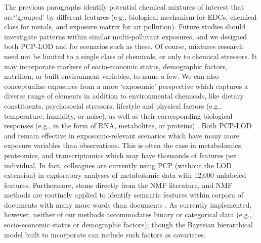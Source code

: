 The previous paragraphs identify potential chemical mixtures of interest that are`'grouped' by different features (e.g., biological mechanism for EDCs, chemical class for metals, and exposure matrix for air pollution). Future studies should investigate patterns within similar multi-pollutant exposures, and we designed both PCP-LOD and \bnmf for scenarios such as these. Of course, mixtures research need not be limited to a single class of chemicals, or only to chemical stressors. It may incorporate markers of socio-economic status, demographic factors, nutrition, or built environment variables, to name a few. We can also conceptualize exposures from a more `exposomic' perspective which captures a diverse range of elements in addition to environmental chemicals, like dietary constituents, psychosocial stressors, lifestyle and physical factors (e.g., temperature, humidity, or noise), as well as their corresponding biological responses (e.g., in the form of RNA, metabolites, or proteins) \citep{vermeulen2020exposome}. Both PCP-LOD and \bnmf remain effective in exposomic-relevant scenarios which have many more exposure variables than observations. This is often the case in metabolomics, proteomics, and transcriptomics which may have thousands of features per individual. In fact, colleagues are currently using PCP (without the LOD extension) in exploratory analyses of metabolomic data with 12,000 unlabeled features. Furthermore, \bnmf stems directly from the NMF literature, and NMF methods are routinely applied to identify semantic features within corpora of documents with many more words than documents \citep{blei2003latent, paisley2014bayesian}. As currently implemented, however, neither of our methods accommodates binary or categorical data (e.g., socio-economic status or demographic factors); though the Bayesian hierarchical model built to incorporate \bnmf can include such factors as covariates. %


